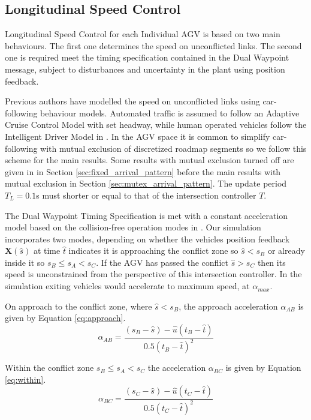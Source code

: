 \subsection{Longitudinal Speed Control}
Longitudinal Speed Control for each Individual AGV is based on two main behaviours. The first one determines the speed on unconflicted links. The second one is required meet the timing specification contained in the Dual Waypoint message, subject to disturbances and uncertainty in the plant using position feedback.  

Previous authors have modelled the speed on unconflicted links using car-following behaviour models. Automated traffic is assumed to follow an Adaptive Cruise Control Model with set headway, while human operated vehicles follow the Intelligent Driver Model in \cite{Baz2020}. In the AGV space it is common to simplify car-following with mutual exclusion of discretized roadmap segments  \cite{Digani2014coord} so we follow this scheme for the main results. Some results with mutual exclusion turned off are given in  in Section \ref{sec:fixed_arrival_pattern} before the main results with mutual exclusion in Section \ref{sec:mutex_arrival_pattern}. The update period $T_L=0.1$s must shorter or equal to that of the intersection controller $T$. 

The Dual Waypoint Timing Specification is met with a constant acceleration model based on the collision-free operation modes in \cite{He2020}. 
Our simulation incorporates two modes, depending on whether the vehicles position feedback $\bm{X}(\hat{s})$ at time $\hat{t}$ indicates it is approaching the conflict zone so $\hat{s}<s_B$ or already inside it so $s_B\leq s_A<s_C$. If the AGV has passed the conflict $\hat{s}>s_C$ then its speed is unconstrained from the perspective of this intersection controller. In the simulation exiting vehicles would accelerate to maximum speed, at $\alpha_{max}$.

On approach to the conflict zone, where $\hat{s}<s_B$, the approach acceleration $\alpha_{AB}$ is given by Equation \ref{eq:approach}.
\begin{equation}
	\alpha_{AB} = \frac{(s_B - \hat{s}) - \hat{u}(t_B - \hat{t}) }{0.5 (t_B - \hat{t})^2}
	\label{eq:approach}
\end{equation}

Within the conflict zone $s_B \leq s_A<s_C$ the acceleration $\alpha_{BC}$ is given by Equation \ref{eq:within}.
\begin{equation}
	\alpha_{BC} = \frac{(s_C - \hat{s}) - \hat{u}(t_C - \hat{t}) }{0.5 (t_C - \hat{t})^2}
	\label{eq:within}
\end{equation}

